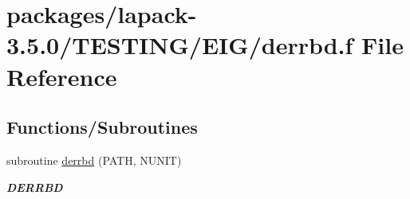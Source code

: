 \hypertarget{derrbd_8f}{}\section{packages/lapack-\/3.5.0/\+T\+E\+S\+T\+I\+N\+G/\+E\+I\+G/derrbd.f File Reference}
\label{derrbd_8f}
\subsection*{Functions/\+Subroutines}
\begin{DoxyCompactItemize}
\item 
subroutine \hyperlink{group__double__eig_gad5e18a852c76f0b059ad31c83f06b8cc}{derrbd} (P\+A\+T\+H, N\+U\+N\+I\+T)
\begin{DoxyCompactList}\small\item\em {\bfseries D\+E\+R\+R\+B\+D} \end{DoxyCompactList}\end{DoxyCompactItemize}
